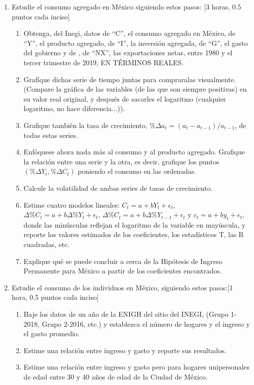 \documentclass[
]{article}
\begin{document}
\begin{enumerate}
\item Estudie el consumo agregado en México siguiendo estos pasos: [3 horas, 0.5 puntos cada inciso]
\begin{enumerate}
\item Obtenga, del Inegi, datos de ``C'', el consumo agregado en México, de ``Y'', el producto agregado, de ``I'', la inversión agregada, de ``G'', el gasto del gobierno y de , de ``NX'', las exportaciones netas,  entre 1980 y el tercer trimestre de 2019, EN TÉRMINOS REALES.
\item Grafíque dichas serie de tiempo juntas para compraralas visualmente.  (Compare la gráfica de las variables (de las que son siempre positivas) en su valor real original, y después de sacarles el logaritmo (cualquier logaritmo, no hace diferencia...)).
\item Grafique también la tasa de crecimiento, $ \% \Delta a_t = (a_t-a_{t-1})/a_{t-1}$,  de todas estas series. 
\item Enfóquese ahora nada más al consumo y al producto agregado. Grafique la relación entre una serie y la otra, es decir, grafique los puntos $(\% \Delta Y_t,\% \Delta C_t)$ poniendo el consumo en las ordenadas.
\item Calcule la volatilidad de ambas series de tasas de crecimiento.
\item Estime cuatro modelos lineales: $C_t=a+bY_t+\epsilon_t$, $\Delta\%C_t=a+b \Delta\%Y_t+\epsilon_t$, $\Delta\%C_t=a+b \Delta\%Y_{t-1}+\epsilon_t$ y $c_t=a+by_t+\epsilon_t$, donde las minúsculas reflejan el logaritmo de la variable en mayúscula, y reporte los valores estimados de los coeficientes, los estadísticos T, las R cuadradas, etc.
\item Explique qué se puede concluir a cerca de la Hipótesis de Ingreso Permanente para México a partir de los coeficientes encontrados.
\end{enumerate}
\item Estudie el consumo de los individuos en México, siguiendo estos pasos:[1 hora, 0.5 puntos cada inciso]
\begin{enumerate}
\item Baje los datos de un año de la ENIGH del sitio del INEGI, (Grupo 1-2018, Grupo 2-2016, etc.)  y establezca el número de hogares y el ingreso y el gasto promedio.
\item Estime una relación entre ingreso y gasto y reporte sus resultados.
\item Estime una relación entre ingreso y gasto pero para hogares unipersonales de edad entre 30 y 40 años de edad de la Ciudad de México.

\end{enumerate}
\end{enumerate}
\end{document}
